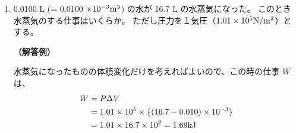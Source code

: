 \documentclass[uplatex,dvipdfmx,a4paper,11pt]{jsarticle}
\begin{document}
\begin{appendix}
\begin{enumerate}
\begin{enumerate}
\item
0.0100 L (= 0.0100 $\times 10^{-3} {\rm m}^3$) の水が 16.7 L の水蒸気になった。
このとき水蒸気のする仕事はいくらか。
ただし圧力を１気圧（$1.01 \times 10^5 {\rm N}/{\rm m}^2$）とする。

{\bf （解答例）}

水蒸気になったものの体積変化だけを考えればよいので、この時の仕事 $W$ は、
\begin{align*}
W &= P \Delta V \\
	&= 1.01 \times 10^5 \times \{ (16.7 - 0.010) \times 10^{-3} \} \\
	&= 1.01 \times 16.7 \times 10^{2} = 1.69 {\rm kJ}
\end{align*}

\end{enumerate}



\end{enumerate}
\end{appendix}
\end{document}
